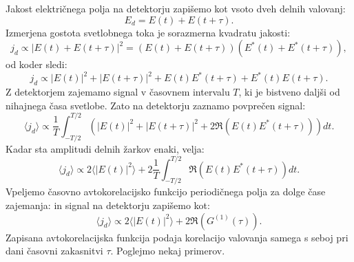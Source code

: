Jakost
električnega polja na detektorju zapišemo kot vsoto dveh delnih valovanj:
\begin{equation}
E_d = E(t) + E(t+\tau).
\label{eq:08_06}
\end{equation}
Izmerjena gostota svetlobnega toka je sorazmerna kvadratu jakosti:
\begin{equation}
j_d \propto |E(t) + E(t+\tau)|^2 = \left(E(t) + E(t+\tau)\right) 
\left(E^*(t) + E^*(t+\tau)\right)\!,
\label{eq:08_07}
\end{equation}
od koder sledi:
\begin{equation}
j_d \propto |E(t)|^2 + |E(t+\tau)|^2 + E(t)E^*(t+\tau) + E^*(t)E(t+\tau).
\label{eq:08_08}
\end{equation}
Z detektorjem zajemamo signal v časovnem intervalu $T$, ki je bistveno 
daljši od nihajnega časa svetlobe. Zato na detektorju zaznamo povprečen signal:
\begin{equation}
\langle j_d \rangle \propto \frac{1}{T}\int_{-T/2}^{T/2} 
\left(|E(t)|^2 + |E(t+\tau)|^2 + 2 \Re \left( E(t)E^*(t+\tau)\right) \right) dt.
\label{eq:08_09}
\end{equation}
Kadar sta amplitudi delnih žarkov enaki, velja:
\begin{equation}
\langle j_d \rangle \propto 2\langle |E(t)|^2 \rangle + 2\frac{1}{T}\int_{-T/2}^{T/2} 
\Re \left( E(t)E^*(t+\tau)\right) dt.
\label{eq:08_10}
\end{equation}
Vpeljemo časovno avtokorelacijsko funkcijo periodičnega polja za dolge čase zajemanja:
in signal na detektorju zapišemo kot:
\begin{equation}
\langle j_d \rangle \propto 2\langle |E(t)|^2 \rangle + 
2\Re \left( G^{(1)}(\tau)\right)\!\!.
\label{eq:08_11}
\end{equation}
Zapisana avtokorelacijska funkcija podaja korelacijo valovanja samega s seboj pri
dani časovni zakasnitvi $\tau$. Poglejmo nekaj primerov.

